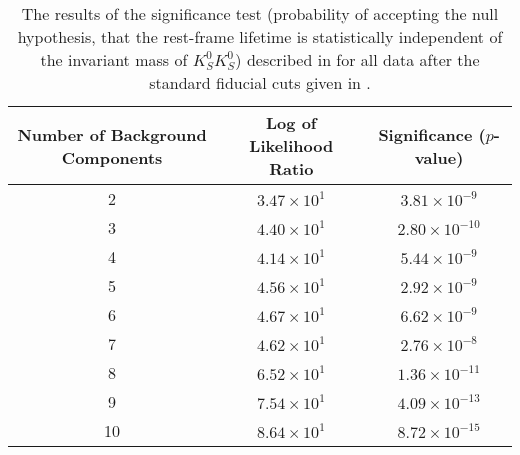 \begin{table}[ht]
    \begin{center}
        \begin{tabular}{ccc}\toprule
            Number of Background Components & Log of Likelihood Ratio & Significance ($p$-value) \\\midrule
             2 & $3.47 \times 10^{1}$ & $3.81 \times 10^{-9}$ \\
             3 & $4.40 \times 10^{1}$ & $2.80 \times 10^{-10}$ \\
             4 & $4.14 \times 10^{1}$ & $5.44 \times 10^{-9}$ \\
             5 & $4.56 \times 10^{1}$ & $2.92 \times 10^{-9}$ \\
             6 & $4.67 \times 10^{1}$ & $6.62 \times 10^{-9}$ \\
             7 & $4.62 \times 10^{1}$ & $2.76 \times 10^{-8}$ \\
             8 & $6.52 \times 10^{1}$ & $1.36 \times 10^{-11}$ \\
             9 & $7.54 \times 10^{1}$ & $4.09 \times 10^{-13}$ \\
             10 & $8.64 \times 10^{1}$ & $8.72 \times 10^{-15}$ \\\bottomrule
        \end{tabular}
        \caption{The results of the significance test (probability of accepting the null hypothesis, that the rest-frame lifetime is statistically independent of the invariant mass of $K_S^0K_S^0$) described in  for all data after the standard fiducial cuts given in .}\label{tab:independence-test}
    \end{center}
\end{table}